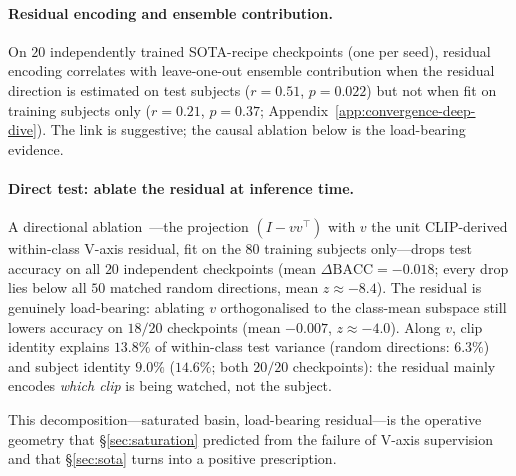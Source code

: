 \begin{revblock}
\paragraph{Residual encoding and ensemble contribution.}
On $20$ independently trained SOTA-recipe checkpoints (one per seed),
residual encoding correlates with leave-one-out ensemble contribution when the
residual direction is estimated on test subjects ($r{=}0.51$, $p{=}0.022$) but not
when fit on training subjects only ($r{=}0.21$, $p{=}0.37$;
Appendix~\ref{app:convergence-deep-dive}). The link is suggestive; the causal
ablation below is the load-bearing evidence.

\paragraph{Direct test: ablate the residual at inference time.}
A directional ablation~\citep{arditi2024refusal}---the projection
$(I - vv^\top)$ with $v$ the unit CLIP-derived within-class V-axis
residual, fit on the $80$ training subjects only---drops test accuracy on
all $20$ independent checkpoints (mean $\Delta\mathrm{BACC}{=}{-}0.018$;
every drop lies below all $50$ matched random directions, mean
$z{\approx}{-}8.4$). The residual is genuinely load-bearing: ablating
$v$ orthogonalised to the class-mean subspace still lowers accuracy on
$18/20$ checkpoints (mean ${-}0.007$, $z{\approx}{-}4.0$). Along $v$, clip identity
explains $13.8\%$ of within-class test variance (random directions: $6.3\%$) and
subject identity $9.0\%$ ($14.6\%$; both $20/20$ checkpoints): the residual
mainly encodes \emph{which clip} is being watched, not the subject.
\end{revblock}
This
decomposition---saturated
basin, load-bearing residual---is the operative geometry that
\S\ref{sec:saturation} predicted from the failure of V-axis
supervision and that \S\ref{sec:sota} turns into a positive
prescription.
